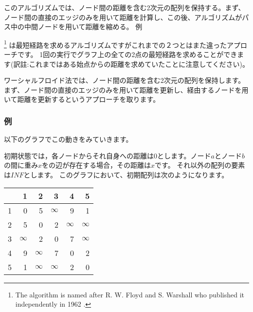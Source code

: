 このアルゴリズムでは、ノード間の距離を含む2次元の配列を保持する。まず、ノード間の直接のエッジのみを用いて距離を計算し、この後、アルゴリズムがパス中の中間ノードを用いて距離を縮める。
例

\footnote{The algorithm
is named after R. W. Floyd and S. Warshall
who published it independently in 1962 \cite{flo62,war62}.}
は最短経路を求めるアルゴリズムですがこれまでの２つとはまた違ったアプローチです。
1回の実行でグラフ上の全ての2点の最短経路を求めることができます(訳註:これまではある始点からの距離を求めていたことに注意してください)。

ワーシャルフロイド法では、ノード間の距離を含む2次元の配列を保持します。
まず、ノード間の直接のエッジのみを用いて距離を更新し、経由するノードを用いて距離を更新するというアプローチを取ります。

\subsubsection{例}
以下のグラフでこの動きをみていきます。

\begin{center}
\end{center}

初期状態では，各ノードからそれ自身への距離は$0$とします。ノード$a$とノード$b$の間に重み$x$をの辺が存在する場合，その距離は$x$です。
それ以外の配列の要素は$INF$とします。
このグラフにおいて、初期配列は次のようになります。

\begin{center}
\begin{tabular}{r|rrrrr}
 & 1 & 2 & 3 & 4 & 5 \\
\hline
1 & 0 & 5 & $\infty$ & 9 & 1 \\
2 & 5 & 0 & 2 & $\infty$ & $\infty$ \\
3 & $\infty$ & 2 & 0 & 7 & $\infty$ \\
4 & 9 & $\infty$ & 7 & 0 & 2 \\
5 & 1 & $\infty$ & $\infty$ & 2 & 0 \\
\end{tabular}
\end{center}
\vspace{10pt}

